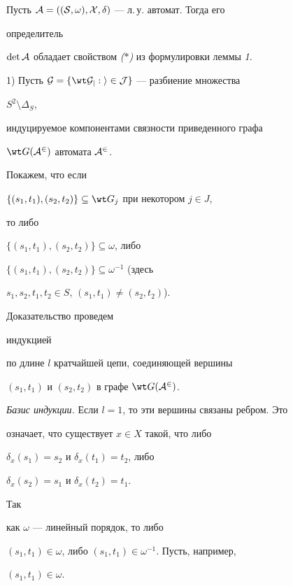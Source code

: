 \begin{lem}


Пусть $\cal A=((S,\omega),X,\delta)$ --- л.\,у. автомат. Тогда его


определитель


$\det\cal A$ обладает свойством {\em ($\ast$)} из формулировки леммы {\em 1}.


\end{lem}





\begin{pf}


1) Пусть $\cal G=\{\wt G_j:i\in J\}$ --- разбиение множества


$S^2\setminus\Delta_S$,


индуцируемое компонентами связности приведенного графа


$\wt G(\cal A^2)$ автомата $\cal A^2$.





Покажем, что если


$\{(s_1,t_1),(s_2,t_2)\}\subseteq\wt G_j$ при некотором $j\in J$,


то либо


$\{(s_1,t_1),(s_2,t_2)\}\subseteq\omega$, либо


$\{(s_1,t_1),(s_2,t_2)\}\subseteq\omega^{-1}$ (здесь


$s_1,s_2,t_1,t_2\in S$, $(s_1,t_1)\ne(s_2,t_2)$).


Доказательство проведем


индукцией


по длине $l$ кратчайшей цепи, соединяющей вершины


$(s_1,t_1)$ и $(s_2,t_2)$ в графе $\wt G(\cal A^2)$.





{\em Базис индукции.} Если $l=1$, то эти вершины связаны ребром. Это


означает, что существует $x\in X$ такой, что либо


$\delta_x(s_1)=s_2$ и $\delta_x(t_1)=t_2$, либо


$\delta_x(s_2)=s_1$ и $\delta_x(t_2)=t_1$.


Так


как $\omega$ --- линейный порядок, то либо


$(s_1,t_1)\in\omega$, либо $(s_1,t_1)\in\omega^{-1}$. Пусть, например,


$(s_1,t_1)\in\omega$.



\end{pf}
